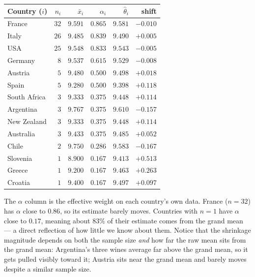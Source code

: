 \documentclass[11pt]{article}
\begin{document}
\begin{center}
\begin{tabular}{l r r r r r}
\toprule
Country ($i$) & $n_i$ & $\bar{x}_i$ & $\alpha_i$ & $\hat{\theta}_i$ & shift \\
\midrule
France       & $32$ & $9.591$ & $0.865$ & $9.581$ & $-0.010$ \\
Italy        & $26$ & $9.485$ & $0.839$ & $9.490$ & $+0.005$ \\
USA          & $25$ & $9.548$ & $0.833$ & $9.543$ & $-0.005$ \\
Germany      &  $8$ & $9.537$ & $0.615$ & $9.529$ & $-0.008$ \\
Austria      &  $5$ & $9.480$ & $0.500$ & $9.498$ & $+0.018$ \\
Spain        &  $5$ & $9.280$ & $0.500$ & $9.398$ & $+0.118$ \\
South Africa &  $3$ & $9.333$ & $0.375$ & $9.448$ & $+0.114$ \\
Argentina    &  $3$ & $9.767$ & $0.375$ & $9.610$ & $-0.157$ \\
New Zealand  &  $3$ & $9.333$ & $0.375$ & $9.448$ & $+0.114$ \\
Australia    &  $3$ & $9.433$ & $0.375$ & $9.485$ & $+0.052$ \\
Chile        &  $2$ & $9.750$ & $0.286$ & $9.583$ & $-0.167$ \\
Slovenia     &  $1$ & $8.900$ & $0.167$ & $9.413$ & $+0.513$ \\
Greece       &  $1$ & $9.200$ & $0.167$ & $9.463$ & $+0.263$ \\
Croatia      &  $1$ & $9.400$ & $0.167$ & $9.497$ & $+0.097$ \\
\bottomrule
\end{tabular}
\end{center}

\vspace{0.5em}
The $\alpha$ column is the effective weight on each country's own data.
France ($n = 32$) has $\alpha$ close to $0.86$, so its estimate barely
moves. Countries with $n = 1$ have $\alpha$ close to $0.17$, meaning
about $83\%$ of their estimate comes from the grand mean --- a direct
reflection of how little we know about them. Notice that the shrinkage
magnitude depends on both the sample size \emph{and} how far the raw
mean sits from the grand mean: Argentina's three wines average far above
the grand mean, so it gets pulled visibly toward it; Austria sits near
the grand mean and barely moves despite a similar sample size.
\end{document}
